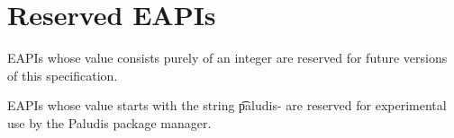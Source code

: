 \section{Reserved EAPIs}

\begin{compactitem}
\item EAPIs whose value consists purely of an integer are reserved for future versions of this
    specification.
\item EAPIs whose value starts with the string \t{paludis-} are reserved for experimental
    use by the Paludis package manager.
\end{compactitem}


